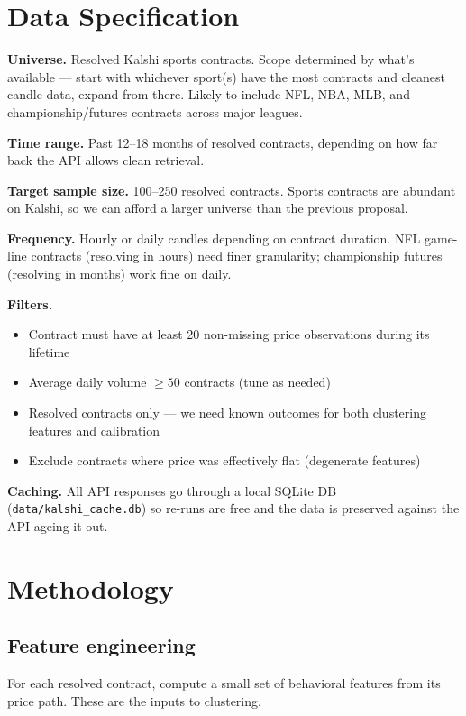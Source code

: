 \documentclass[11pt]{article}
\begin{document}
\section{Data Specification}

\textbf{Universe.} Resolved Kalshi sports contracts. Scope determined by what's available --- start with whichever sport(s) have the most contracts and cleanest candle data, expand from there. Likely to include NFL, NBA, MLB, and championship/futures contracts across major leagues.

\textbf{Time range.} Past 12--18 months of resolved contracts, depending on how far back the API allows clean retrieval.

\textbf{Target sample size.} 100--250 resolved contracts. Sports contracts are abundant on Kalshi, so we can afford a larger universe than the previous proposal.

\textbf{Frequency.} Hourly or daily candles depending on contract duration. NFL game-line contracts (resolving in hours) need finer granularity; championship futures (resolving in months) work fine on daily.

\textbf{Filters.}
\begin{itemize}[leftmargin=*, itemsep=0pt]
    \item Contract must have at least 20 non-missing price observations during its lifetime
    \item Average daily volume $\geq 50$ contracts (tune as needed)
    \item Resolved contracts only --- we need known outcomes for both clustering features and calibration
    \item Exclude contracts where price was effectively flat (degenerate features)
\end{itemize}

\textbf{Caching.} All API responses go through a local SQLite DB (\texttt{data/kalshi\_cache.db}) so re-runs are free and the data is preserved against the API ageing it out.

\section{Methodology}

\subsection{Feature engineering}

For each resolved contract, compute a small set of behavioral features from its price path. These are the inputs to clustering.
\end{document}
